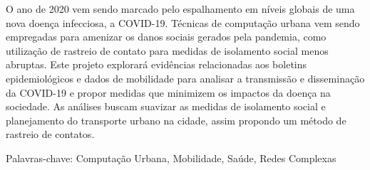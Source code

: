 \begin{resumo}
\vspace{-1cm}

\onehalfspacing

\noindent 
  O ano de 2020 vem sendo marcado pelo espalhamento em níveis globais de uma nova doença
  infecciosa, a COVID-19. Técnicas de computação urbana vem sendo empregadas para amenizar
  os danos sociais gerados pela pandemia, como utilização de rastreio de contato
  para medidas de isolamento social menos abruptas. Este projeto explorará evidências relacionadas aos 
  boletins epidemiológicos e dados de mobilidade para analisar a transmissão e disseminação
  da COVID-19 e propor medidas que minimizem os impactos da doença na sociedade. As análises
  buscam suavizar as medidas de isolamento social e planejamento do transporte urbano na cidade,
  assim propondo um método de rastreio de contatos.

\vspace*{.75cm}

\noindent Palavras-chave: Computação Urbana, Mobilidade, Saúde, Redes Complexas

\end{resumo}